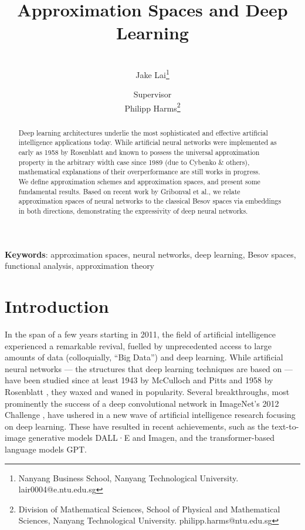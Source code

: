 \documentclass{article}
\theoremstyle{definition}
\theoremstyle{remark}
\begin{document}
\title{Approximation Spaces and Deep Learning}
\author{
\\[-7pt] Jake Lai\thanks{Nanyang Business School, Nanyang Technological University. lair0004@e.ntu.edu.sg}
\and
{\normalsize Supervisor} \\ Philipp Harms\thanks{Division of Mathematical Sciences, School of Physical and Mathematical Sciences, Nanyang Technological University. philipp.harms@ntu.edu.sg}
}
\date{}
\maketitle

\begin{abstract}
\noindent Deep learning architectures underlie the most sophisticated and effective artificial intelligence applications today. While artificial neural networks were implemented as early as 1958 by Rosenblatt and known to possess the universal approximation property in the arbitrary width case since 1989 (due to Cybenko \& others), mathematical explanations of their overperformance are still works in progress.
\\[5pt]
We define approximation schemes and approximation spaces, and present some fundamental results. Based on recent work by Gribonval et al., we relate approximation spaces of neural networks to the classical Besov spaces via embeddings in both directions, demonstrating the expressivity of deep neural networks.
\end{abstract}

\textbf{Keywords}: approximation spaces, neural networks, deep learning, Besov spaces, functional analysis, approximation theory



\section{Introduction}
In the span of a few years starting in 2011, the field of artificial intelligence experienced a remarkable revival, fuelled by unprecedented access to large amounts of data (colloquially, “Big Data”) and deep learning. While artificial neural networks --- the structures that deep learning techniques are based on --- have been studied since at least 1943 by McCulloch and Pitts \cite{mcculloch_logical_1943} and 1958 by Rosenblatt \cite{rosenblatt_perceptron_1958}, they waxed and waned in popularity. Several breakthroughs, most prominently the success of a deep convolutional network in ImageNet’s 2012 Challenge \cite{krizhevsky_imagenet_2012}, have ushered in a new wave of artificial intelligence research focusing on deep learning. These have resulted in recent achievements, such as the text-to-image generative models DALL·E and Imagen, and the transformer-based language models GPT.
\end{document}
